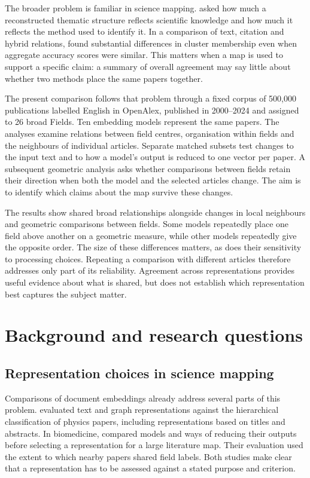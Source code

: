\documentclass[12pt]{article}
\begin{document}
The broader problem is familiar in science mapping. \citet{refa0d2d707e6} asked how much a reconstructed thematic structure reflects scientific knowledge and how much it reflects the method used to identify it. In a comparison of text, citation and hybrid relations, \citet{ref6a2f5912bc} found substantial differences in cluster membership even when aggregate accuracy scores were similar. This matters when a map is used to support a specific claim: a summary of overall agreement may say little about whether two methods place the same papers together.

The present comparison follows that problem through a fixed corpus of 500,000 publications labelled English in OpenAlex, published in 2000--2024 and assigned to 26 broad Fields. Ten embedding models represent the same papers. The analyses examine relations between field centres, organisation within fields and the neighbours of individual articles. Separate matched subsets test changes to the input text and to how a model's output is reduced to one vector per paper. A subsequent geometric analysis asks whether comparisons between fields retain their direction when both the model and the selected articles change. The aim is to identify which claims about the map survive these changes.

The results show shared broad relationships alongside changes in local neighbours and geometric comparisons between fields. Some models repeatedly place one field above another on a geometric measure, while other models repeatedly give the opposite order. The size of these differences matters, as does their sensitivity to processing choices. Repeating a comparison with different articles therefore addresses only part of its reliability. Agreement across representations provides useful evidence about what is shared, but does not establish which representation best captures the subject matter.

\section{Background and research questions}
\subsection{Representation choices in science mapping}
Comparisons of document embeddings already address several parts of this problem. \citet{refc0e2cc29e0} evaluated text and graph representations against the hierarchical classification of physics papers, including representations based on titles and abstracts. In biomedicine, \citet{refbe130e2973} compared models and ways of reducing their outputs before selecting a representation for a large literature map. Their evaluation used the extent to which nearby papers shared field labels. Both studies make clear that a representation has to be assessed against a stated purpose and criterion.
\end{document}
